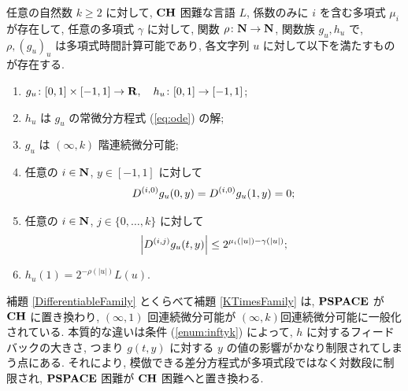  \begin{lemma}
  \label{KTimesFamily}
  任意の自然数 $k \ge 2$ に対して,
  $\mathbf{CH}$ 困難な言語 $L$,
  係数のみに $i$ を含む多項式 $\mu_i$ が存在して,
  任意の多項式 $\gamma$ に対して,
  関数 $\rho \colon \mathbf N \to \mathbf N$, 関数族 $g_u, h_u$ で,
  $\rho, (g_u)_u$ は多項式時間計算可能であり,
  各文字列 $u$ に対して以下を満たすものが存在する.
  \begin{enumerate}
   \item $g_u\colon [0,1] \times [-1,1]\to \mathbf R, \quad h_u\colon [0,1] \to [-1,1]$;
   \item $h_u$ は $g_u$ の常微分方程式 (\ref{eq:ode}) の解;
   \item $g_u$ は $(\infty, k)$ 階連続微分可能;
   \item 任意の $i \in \mathbf N$, $y \in [-1,1]$ に対して
	 \begin{equation*}
	  D^{(i, 0)} g_u(0,y) = D^{(i, 0)} g_u(1,y) = 0 ;
	 \end{equation*}
   \item \label{enum:inftyk}
	 任意の $i \in \mathbf N$, $j \in \{0, \dots, k\}$ に対して
	 \begin{equation*}
	  \left|D^{(i,j)} g_u(t,y)\right| \le 2^{\mu_i(|u|) - \gamma(|u|)};
	 \end{equation*}
   \item $h_u(1) = 2^{-\rho(|u|)}L(u)$.
  \end{enumerate}
 \end{lemma}


補題 \ref{DifferentiableFamily} とくらべて補題 \ref{KTimesFamily} は,
$\mathbf{PSPACE}$ が $\mathbf{CH}$ に置き換わり, $(\infty, 1)$ 回連続微分可能が 
$(\infty, k)$回連続微分可能に一般化されている.
本質的な違いは条件 (\ref{enum:inftyk}) によって, $h$ に対するフィードバックの大きさ,
つまり $g(t,y)$ に対する $y$ の値の影響がかなり制限されてしまう点にある.
それにより, 模倣できる差分方程式が多項式段ではなく対数段に制限され,
$\mathbf{PSPACE}$ 困難が $\mathbf{CH}$ 困難へと置き換わる.



